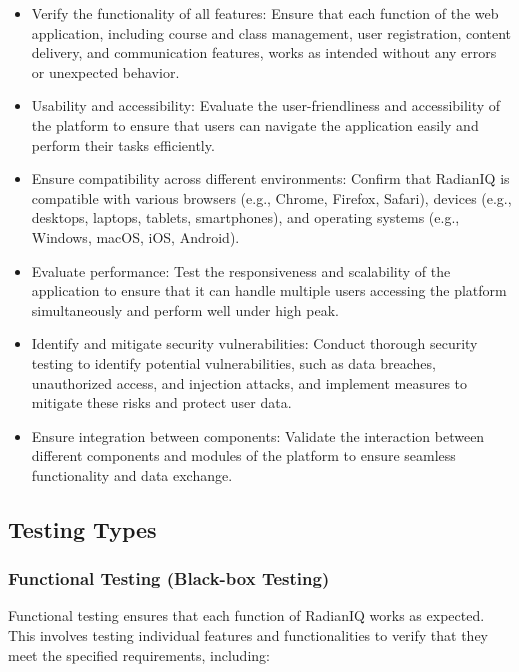 		\begin{itemize}
			\item Verify the functionality of all features: Ensure that each function of the web application, including course and class management, user registration, content delivery, and communication features, works as intended without any errors or unexpected behavior.
			\item Usability and accessibility: Evaluate the user-friendliness and accessibility of the platform to ensure that users can navigate the application easily and perform their tasks efficiently.
			\item Ensure compatibility across different environments: Confirm that RadianIQ is compatible with various browsers (e.g., Chrome, Firefox, Safari), devices (e.g., desktops, laptops, tablets, smartphones), and operating systems (e.g., Windows, macOS, iOS, Android).
			\item Evaluate performance: Test the responsiveness and scalability of the application to ensure that it can handle multiple users accessing the platform simultaneously and perform well under high peak.
			\item Identify and mitigate security vulnerabilities: Conduct thorough security testing to identify potential vulnerabilities, such as data breaches, unauthorized access, and injection attacks, and implement measures to mitigate these risks and protect user data.
			\item Ensure integration between components: Validate the interaction between different components and modules of the platform to ensure seamless functionality and data exchange.
		\end{itemize}

		
	\subsection{Testing Types}
		
		\subsubsection{Functional Testing (Black-box Testing)}
		
		Functional testing ensures that each function of RadianIQ works as expected. This involves testing individual features and functionalities to verify that they meet the specified requirements, including:
		
